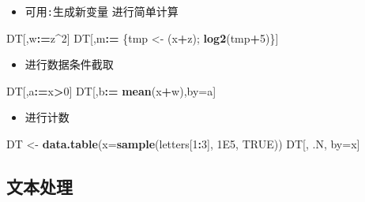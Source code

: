 \documentclass[
]{book}
\newenvironment{Shaded}{\begin{snugshade}}{\end{snugshade}}
\newcommand{\DataTypeTok}[1]{\textcolor[rgb]{0.13,0.29,0.53}{#1}}
\newcommand{\DecValTok}[1]{\textcolor[rgb]{0.00,0.00,0.81}{#1}}
\newcommand{\ErrorTok}[1]{\textcolor[rgb]{0.64,0.00,0.00}{\textbf{#1}}}
\newcommand{\FloatTok}[1]{\textcolor[rgb]{0.00,0.00,0.81}{#1}}
\newcommand{\KeywordTok}[1]{\textcolor[rgb]{0.13,0.29,0.53}{\textbf{#1}}}
\newcommand{\NormalTok}[1]{#1}
\newcommand{\OperatorTok}[1]{\textcolor[rgb]{0.81,0.36,0.00}{\textbf{#1}}}
\newcommand{\OtherTok}[1]{\textcolor[rgb]{0.56,0.35,0.01}{#1}}
\newcommand{\StringTok}[1]{\textcolor[rgb]{0.31,0.60,0.02}{#1}}
\providecommand{\tightlist}{%
  \setlength{\itemsep}{0pt}\setlength{\parskip}{0pt}}
\begin{document}
\begin{itemize}
\tightlist
\item
  可用\texttt{:}生成新变量 进行简单计算
\end{itemize}

\begin{Shaded}
\begin{Highlighting}[]
\NormalTok{DT[,w}\OperatorTok{:}\ErrorTok{=}\NormalTok{z}\OperatorTok{^}\DecValTok{2}\NormalTok{]}
\NormalTok{DT[,m}\OperatorTok{:}\ErrorTok{=}\StringTok{ }\NormalTok{\{tmp <-}\StringTok{ }\NormalTok{(x}\OperatorTok{+}\NormalTok{z); }\KeywordTok{log2}\NormalTok{(tmp}\OperatorTok{+}\DecValTok{5}\NormalTok{)\}]}
\end{Highlighting}
\end{Shaded}

\begin{itemize}
\tightlist
\item
  进行数据条件截取
\end{itemize}

\begin{Shaded}
\begin{Highlighting}[]
\NormalTok{DT[,a}\OperatorTok{:}\ErrorTok{=}\NormalTok{x}\OperatorTok{>}\DecValTok{0}\NormalTok{]}
\NormalTok{DT[,b}\OperatorTok{:}\ErrorTok{=}\StringTok{ }\KeywordTok{mean}\NormalTok{(x}\OperatorTok{+}\NormalTok{w),by=a]}
\end{Highlighting}
\end{Shaded}

\begin{itemize}
\tightlist
\item
  进行计数
\end{itemize}

\begin{Shaded}
\begin{Highlighting}[]
\NormalTok{DT <-}\StringTok{ }\KeywordTok{data.table}\NormalTok{(}\DataTypeTok{x=}\KeywordTok{sample}\NormalTok{(letters[}\DecValTok{1}\OperatorTok{:}\DecValTok{3}\NormalTok{], }\FloatTok{1E5}\NormalTok{, }\OtherTok{TRUE}\NormalTok{))}
\NormalTok{DT[, .N, by=x]}
\end{Highlighting}
\end{Shaded}

\hypertarget{ux6587ux672cux5904ux7406}{%
\subsection{文本处理}\label{ux6587ux672cux5904ux7406}}
\end{document}
